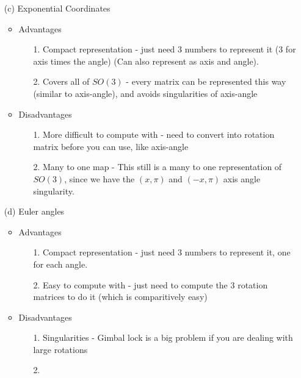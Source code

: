 \documentclass[english]{article}
\begin{document}
\begin{enumerate}
 \item[(c)] Exponential Coordinates 
    \begin{itemize}
     \item Advantages
     \begin{enumerate}
      \item[1.] Compact representation - just need 3 numbers to represent it (3 for axis times the angle) (Can also represent as axis and angle). 
      \item[2.] Covers all of $SO(3)$ - every matrix can be represented this way (similar to axis-angle), and avoids singularities of axis-angle
     \end{enumerate}
     \item Disadvantages
     \begin{enumerate}
      \item[1.] More difficult to compute with - need to convert into rotation matrix before you can use, like axis-angle
      \item[2.] Many to one map - This still is a many to one representation of $SO(3)$, since we have the $(x,\pi)$ and $(-x,\pi)$
                axis angle singularity.
     \end{enumerate}
    \end{itemize}

 \item[(d)] Euler angles 
    \begin{itemize}
     \item Advantages
     \begin{enumerate}
      \item[1.] Compact representation - just need 3 numbers to represent it, one for each angle.  
      \item[2.] Easy to compute with - just need to compute the 3 rotation matrices to do it (which is comparitively easy)
     \end{enumerate}
     \item Disadvantages
     \begin{enumerate}
      \item[1.] Singularities - Gimbal lock is a big problem if you are dealing with large rotations
      \item[2.] 
     \end{enumerate}
    \end{itemize}


\end{enumerate}
\end{document}
